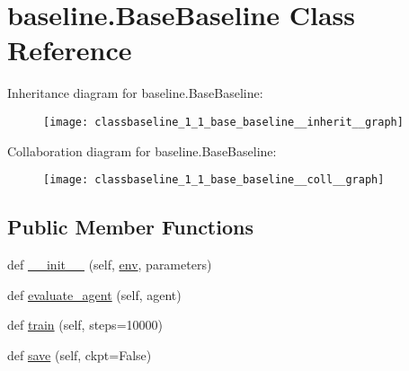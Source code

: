 \hypertarget{classbaseline_1_1_base_baseline}{}\section{baseline.\+Base\+Baseline Class Reference}
\label{classbaseline_1_1_base_baseline}


Inheritance diagram for baseline.\+Base\+Baseline\+:
\nopagebreak
\begin{figure}[H]
\begin{center}
\leavevmode
\texttt{[image: classbaseline\_1\_1\_base\_baseline\_\_inherit\_\_graph]}
\end{center}
\end{figure}


Collaboration diagram for baseline.\+Base\+Baseline\+:
\nopagebreak
\begin{figure}[H]
\begin{center}
\leavevmode
\texttt{[image: classbaseline\_1\_1\_base\_baseline\_\_coll\_\_graph]}
\end{center}
\end{figure}
\subsection*{Public Member Functions}
\begin{DoxyCompactItemize}
\item 
def \hyperlink{classbaseline_1_1_base_baseline_a01486c19bcd1c4eb6085eb956f19ce66}{\+\_\+\+\_\+init\+\_\+\+\_\+} (self, \hyperlink{classbaseline_1_1_base_baseline_afb0d3522c7976304a758f54ff9c4989a}{env}, parameters)
\item 
def \hyperlink{classbaseline_1_1_base_baseline_a252a694ce925b8da0cc43aa88f1c5a5b}{evaluate\+\_\+agent} (self, agent)
\item 
def \hyperlink{classbaseline_1_1_base_baseline_a8406ff47b49ae553f67fcbae80f208fc}{train} (self, steps=10000)
\item 
def \hyperlink{classbaseline_1_1_base_baseline_aaccf8565e0367cfc6aebc3d4a6ec84cf}{save} (self, ckpt=False)
\end{DoxyCompactItemize}
